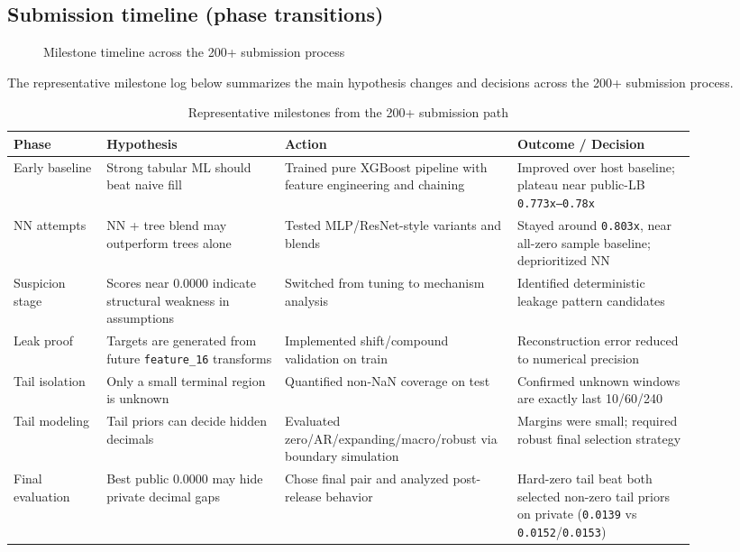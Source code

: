 \subsection{Submission timeline (phase transitions)}
\begin{figure}[h]
\centering
\small
{}
\caption{Milestone timeline across the 200+ submission process}
\end{figure}

The representative milestone log below summarizes the main hypothesis changes and decisions across the 200+ submission process.
\begin{table}[h]
\centering
\small
\caption{Representative milestones from the 200+ submission path}
\begin{tabular}{p{0.12\linewidth} p{0.23\linewidth} p{0.30\linewidth} p{0.23\linewidth}}
\toprule
Phase & Hypothesis & Action & Outcome / Decision \\
\midrule
Early baseline & Strong tabular ML should beat naive fill & Trained pure XGBoost pipeline with feature engineering and chaining & Improved over host baseline; plateau near public-LB \texttt{0.773x--0.78x} \\
NN attempts & NN + tree blend may outperform trees alone & Tested MLP/ResNet-style variants and blends & Stayed around \texttt{0.803x}, near all-zero sample baseline; deprioritized NN \\
Suspicion stage & Scores near 0.0000 indicate structural weakness in assumptions & Switched from tuning to mechanism analysis & Identified deterministic leakage pattern candidates \\
Leak proof & Targets are generated from future \texttt{feature\_16} transforms & Implemented shift/compound validation on train & Reconstruction error reduced to numerical precision \\
Tail isolation & Only a small terminal region is unknown & Quantified non-NaN coverage on test & Confirmed unknown windows are exactly last 10/60/240 \\
Tail modeling & Tail priors can decide hidden decimals & Evaluated zero/AR/expanding/macro/robust via boundary simulation & Margins were small; required robust final selection strategy \\
Final evaluation & Best public 0.0000 may hide private decimal gaps & Chose final pair and analyzed post-release behavior & Hard-zero tail beat both selected non-zero tail priors on private (\texttt{0.0139} vs \texttt{0.0152}/\texttt{0.0153}) \\
\bottomrule
\end{tabular}
\end{table}

